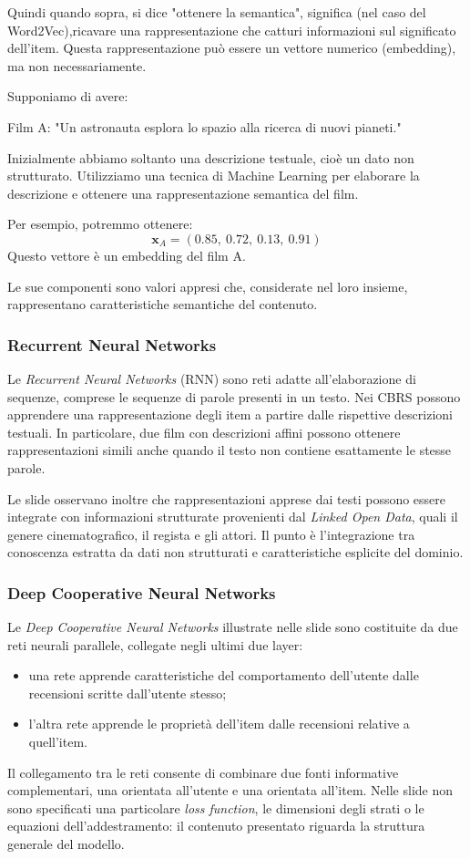 Quindi quando sopra, si dice "ottenere la semantica", significa (nel caso del Word2Vec),ricavare una rappresentazione che catturi informazioni sul significato dell'item.
Questa rappresentazione può essere un vettore numerico (embedding), ma non necessariamente.

\begin{example}{}
Supponiamo di avere:

Film A: "Un astronauta esplora lo spazio alla ricerca di nuovi pianeti."

Inizialmente abbiamo soltanto una descrizione testuale, cioè un dato non strutturato.
Utilizziamo una tecnica di Machine Learning per elaborare la descrizione e ottenere una rappresentazione semantica del film.

Per esempio, potremmo ottenere:
\[
\mathbf{x}_A=(0.85,\ 0.72,\ 0.13,\ 0.91)
\]
Questo vettore è un embedding del film A.

Le sue componenti sono valori appresi che, considerate nel loro insieme, rappresentano caratteristiche semantiche del contenuto.
\end{example}
\subsubsection{Recurrent Neural Networks}
Le \emph{Recurrent Neural Networks} (RNN) sono reti adatte all'elaborazione di sequenze, comprese le sequenze di parole presenti in un testo. Nei CBRS possono apprendere una rappresentazione degli item a partire dalle rispettive descrizioni testuali. In particolare, due film con descrizioni affini possono ottenere rappresentazioni simili anche quando il testo non contiene esattamente le stesse parole.

Le slide osservano inoltre che rappresentazioni apprese dai testi possono essere integrate con informazioni strutturate provenienti dal \emph{Linked Open Data}, quali il genere cinematografico, il regista e gli attori. Il punto è l'integrazione tra conoscenza estratta da dati non strutturati e caratteristiche esplicite del dominio.

\subsubsection{Deep Cooperative Neural Networks}
Le \emph{Deep Cooperative Neural Networks} illustrate nelle slide sono costituite da due reti neurali parallele, collegate negli ultimi due layer:
\begin{itemize}
    \item una rete apprende caratteristiche del comportamento dell'utente dalle recensioni scritte dall'utente stesso;
    \item l'altra rete apprende le proprietà dell'item dalle recensioni relative a quell'item.
\end{itemize}
Il collegamento tra le reti consente di combinare due fonti informative complementari, una orientata all'utente e una orientata all'item. Nelle slide non sono specificati una particolare \emph{loss function}, le dimensioni degli strati o le equazioni dell'addestramento: il contenuto presentato riguarda la struttura generale del modello.

